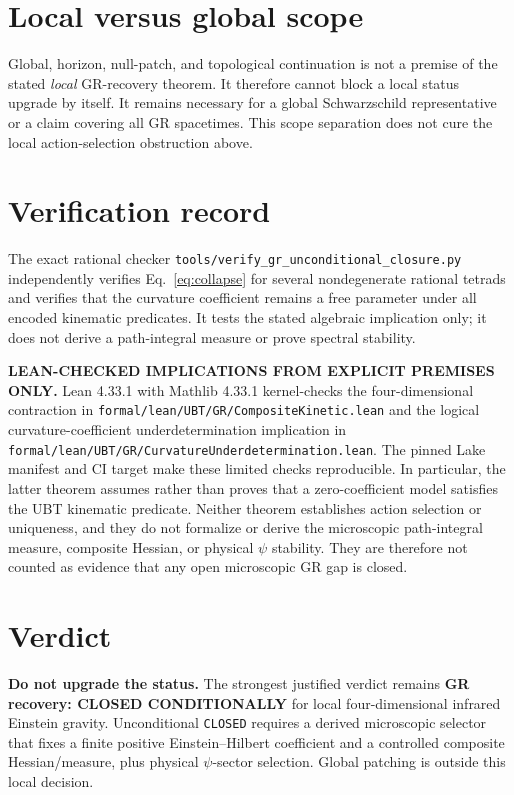\documentclass[11pt,a4paper]{article}
\begin{document}
\section{Local versus global scope}
Global, horizon, null-patch, and topological continuation is not a premise of
the stated \emph{local} GR-recovery theorem.  It therefore cannot block a
local status upgrade by itself.  It remains necessary for a global
Schwarzschild representative or a claim covering all GR spacetimes.  This
scope separation does not cure the local action-selection obstruction above.

\section{Verification record}
The exact rational checker
\texttt{tools/verify\_gr\_unconditional\_closure.py} independently verifies
Eq.~\eqref{eq:collapse} for several nondegenerate rational tetrads and verifies
that the curvature coefficient remains a free parameter under all encoded
kinematic predicates.  It tests the stated algebraic implication only; it
does not derive a path-integral measure or prove spectral stability.

\textbf{LEAN-CHECKED IMPLICATIONS FROM EXPLICIT PREMISES ONLY.}  Lean 4.33.1
with Mathlib 4.33.1 kernel-checks the four-dimensional contraction in
\texttt{formal/lean/UBT/GR/CompositeKinetic.lean} and the logical
curvature-coefficient underdetermination implication in
\texttt{formal/lean/UBT/GR/CurvatureUnderdetermination.lean}.  The pinned Lake
manifest and CI target make these limited checks reproducible.  In particular,
the latter theorem assumes rather than proves that a zero-coefficient model
satisfies the UBT kinematic predicate.  Neither theorem establishes action
selection or uniqueness, and they do not formalize or derive the microscopic
path-integral measure, composite Hessian, or physical $\psi$ stability.  They
are therefore not counted as evidence that any open microscopic GR gap is
closed.

\section{Verdict}
\begin{tcolorbox}[colback=yellow!7!white,colframe=yellow!55!black,title=Status decision]
\textbf{Do not upgrade the status.}  The strongest justified verdict remains
\textbf{GR recovery: CLOSED CONDITIONALLY} for local four-dimensional
infrared Einstein gravity.  Unconditional \texttt{CLOSED} requires a derived
microscopic selector that fixes a finite positive Einstein--Hilbert
coefficient and a controlled composite Hessian/measure, plus physical
$\psi$-sector selection.  Global patching is outside this local decision.
\end{tcolorbox}
\end{document}
